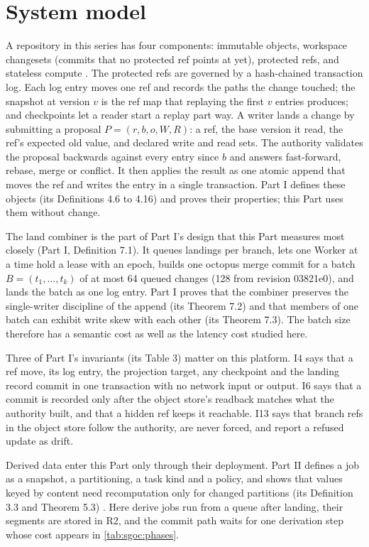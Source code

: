 \documentclass[11pt,letterpaper]{article}
\theoremstyle{definition}
\theoremstyle{remark}
\begin{document}
\section{System model}
\label{sec:sgoc:model}

A repository in this series has four components: immutable objects, workspace changesets (commits that no protected ref points at yet), protected refs, and stateless compute \cite{long2026partI}. The protected refs are governed by a hash-chained transaction log. Each log entry moves one ref and records the paths the change touched; the snapshot at version $v$ is the ref map that replaying the first $v$ entries produces; and checkpoints let a reader start a replay part way. A writer lands a change by submitting a proposal $P = (r, b, o, W, R)$: a ref, the base version it read, the ref's expected old value, and declared write and read sets. The authority validates the proposal backwards against every entry since $b$ and answers fast-forward, rebase, merge or conflict. It then applies the result as one atomic append that moves the ref and writes the entry in a single transaction. Part I defines these objects (its Definitions 4.6 to 4.16) and proves their properties; this Part uses them without change.

The land combiner is the part of Part I's design that this Part measures most closely (Part I, Definition 7.1). It queues landings per branch, lets one Worker at a time hold a lease with an epoch, builds one octopus merge commit for a batch $B = (t_1, \dots, t_k)$ of at most 64 queued changes (128 from revision 03821e0), and lands the batch as one log entry. Part I proves that the combiner preserves the single-writer discipline of the append (its Theorem 7.2) and that members of one batch can exhibit write skew with each other (its Theorem 7.3). The batch size therefore has a semantic cost as well as the latency cost studied here.

Three of Part I's invariants (its Table 3) matter on this platform. I4 says that a ref move, its log entry, the projection target, any checkpoint and the landing record commit in one transaction with no network input or output. I6 says that a commit is recorded only after the object store's readback matches what the authority built, and that a hidden ref keeps it reachable. I13 says that branch refs in the object store follow the authority, are never forced, and report a refused update as drift.

Derived data enter this Part only through their deployment. Part II defines a job as a snapshot, a partitioning, a task kind and a policy, and shows that values keyed by content need recomputation only for changed partitions (its Definition 3.3 and Theorem 5.3) \cite{long2026partII}. Here derive jobs run from a queue after landing, their segments are stored in R2, and the commit path waits for one derivation step whose cost appears in \cref{tab:sgoc:phases}.
\end{document}
